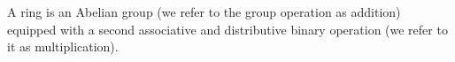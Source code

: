 \begin{definition}[Ring]
    A ring is an Abelian group (we refer to the group operation as addition) equipped with a second associative and distributive binary operation (we refer to it as multiplication).
\end{definition}

